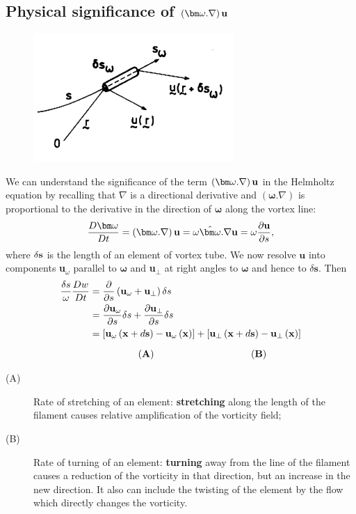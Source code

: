 \documentclass[10pt]{report}
\begin{document}
\subsection{Physical significance of $\left( {{\bm\omega}. \nabla } \right){\rm
{\bf u}}$}

\begin{figure}
\centerline{\includegraphics[width=3in]{Section43.pdf}}
\caption{ }
\label{fig4.3}
\end{figure}

We can understand the significance of the term $\left( {{\bm\omega}. \nabla }
\right){{\bf u}}$ in the Helmholtz equation by recalling that $\nabla $
is a directional derivative and $({\bm\omega}.  \nabla )$ is
proportional to the derivative in the direction of ${\bm\omega}$ along
the vortex line:
\[
\frac{D{\bm\omega}}{Dt}=\left( {{\bm\omega}. \nabla } \right){{\bf u}}=\omega \hat
{{\bm\omega}}. \nabla {{\bf u}}=\omega \frac{\partial {{\bf u}}}{\partial
s},
\]
where $\delta {\bf s}$ is the length of an element of vortex tube. We now resolve
$\textbf{u}$ into components \textbf{u}$_{\omega }$ parallel to ${\bm\omega}$
 and \textbf{u}$_{\bot }$ at right angles to
${\bm\omega}$ and hence to $\delta \textbf{s}$. Then
\begin{align*}
 \frac{\delta s}{\omega }\frac{Dw}{Dt} &=\frac{\partial }{\partial
s}\left( {{{\bf u}}_\omega +{{\bf u}}_\bot } \right)\delta s  \\
 & =\frac{\partial {{\bf u}}_\omega }{\partial
s}\delta s+\frac{\partial {{\bf u}}_\bot }{\partial s}\delta s \\
& =\left[ {{{\bf u}}_\omega \left( {{{\bf
x}}+d{{\bf s}}} \right)-{{\bf u}}_\omega \left( {{\bf x}}
\right)} \right]+\left[ {{{\bf u}}_\bot \left( {{{\bf x}}+d{{\bf
s}}} \right)-{{\bf u}}_\bot \left( {{\bf x}} \right)} \right] \\
\noalign{\medskip}
& \qquad \qquad \quad{\bf (A)} \qquad \qquad \qquad \qquad \qquad {\bf (B)}
 \end{align*}
\begin{description}
\item[(A)] Rate of stretching of an element: \textbf{stretching} along the length of the filament causes relative amplification of the vorticity field;
\item[(B)] Rate of turning of an element: \textbf{turning} away from the line of the filament causes a reduction of the vorticity in that direction, but an increase in the new direction.
It also can include the twisting of the element by the flow which directly changes the vorticity.
\end{description}
\end{document}
